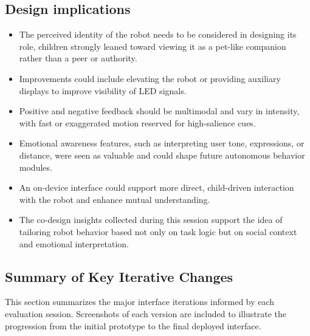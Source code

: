 \documentclass[a4paper]{usiinfbachelorproject}
\begin{document}
\subsection*{\textbf{Design implications}}
\begin{itemize}
    \item The perceived identity of the robot needs to be considered in designing its role, children strongly leaned toward viewing it as a pet-like companion rather than a peer or authority.
    \item Improvements could include elevating the robot or providing auxiliary displays to improve visibility of LED signals.
    \item Positive and negative feedback should be multimodal and vary in intensity, with fast or exaggerated motion reserved for high-salience cues.
    \item Emotional awareness features, such as interpreting user tone, expressions, or distance, were seen as valuable and could shape future autonomous behavior modules.
    \item An on-device interface could support more direct, child-driven interaction with the robot and enhance mutual understanding.
    \item The co-design insights collected during this session support the idea of tailoring robot behavior based not only on task logic but on social context and emotional interpretation.
\end{itemize}

\subsection{\textbf{Summary of Key Iterative Changes}}

This section summarizes the major interface iterations informed by each evaluation session.
Screenshots of each version are included to illustrate the progression from the initial prototype to the final deployed interface.
\end{document}

